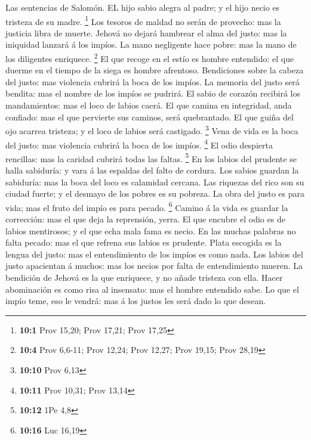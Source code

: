  Las sentencias de Salomón. EL hijo sabio alegra al padre; y
el hijo necio es tristeza de su madre. \footnote{\textbf{10:1} Prov
  15,20; Prov 17,21; Prov 17,25}  Los tesoros de maldad no
serán de provecho: mas la justicia libra de muerte.  Jehová
no dejará hambrear el alma del justo: mas la iniquidad lanzará á los
impíos.  La mano negligente hace pobre: mas la mano de los
diligentes enriquece. \footnote{\textbf{10:4} Prov 6,6-11; Prov 12,24;
  Prov 12,27; Prov 19,15; Prov 28,19}  El que recoge en el
estío es hombre entendido: el que duerme en el tiempo de la siega es
hombre afrentoso.  Bendiciones sobre la cabeza del justo:
mas violencia cubrirá la boca de los impíos.  La memoria del
justo será bendita: mas el nombre de los impíos se pudrirá. 
El sabio de corazón recibirá los mandamientos: mas el loco de labios
caerá.  El que camina en integridad, anda confiado: mas el
que pervierte sus caminos, será quebrantado.  El que guiña
del ojo acarrea tristeza; y el loco de labios será castigado.
\footnote{\textbf{10:10} Prov 6,13}  Vena de vida es la
boca del justo: mas violencia cubrirá la boca de los impíos. \footnote{\textbf{10:11}
  Prov 10,31; Prov 13,14}  El odio despierta rencillas: mas
la caridad cubrirá todas las faltas. \footnote{\textbf{10:12} 1Pe 4,8}
 En los labios del prudente se halla sabiduría: y vara á
las espaldas del falto de cordura.  Los sabios guardan la
sabiduría: mas la boca del loco es calamidad cercana.  Las
riquezas del rico son su ciudad fuerte; y el desmayo de los pobres es su
pobreza.  La obra del justo es para vida; mas el fruto del
impío es para pecado. \footnote{\textbf{10:16} Luc 16,19} 
Camino á la vida es guardar la corrección: mas el que deja la
reprensión, yerra.  El que encubre el odio es de labios
mentirosos; y el que echa mala fama es necio.  En las
muchas palabras no falta pecado: mas el que refrena sus labios es
prudente.  Plata escogida es la lengua del justo: mas el
entendimiento de los impíos es como nada.  Los labios del
justo apacientan á muchos: mas los necios por falta de entendimiento
mueren.  La bendición de Jehová es la que enriquece, y no
añade tristeza con ella.  Hacer abominación es como risa al
insensato: mas el hombre entendido sabe.  Lo que el impío
teme, eso le vendrá: mas á los justos les será dado lo que desean.

